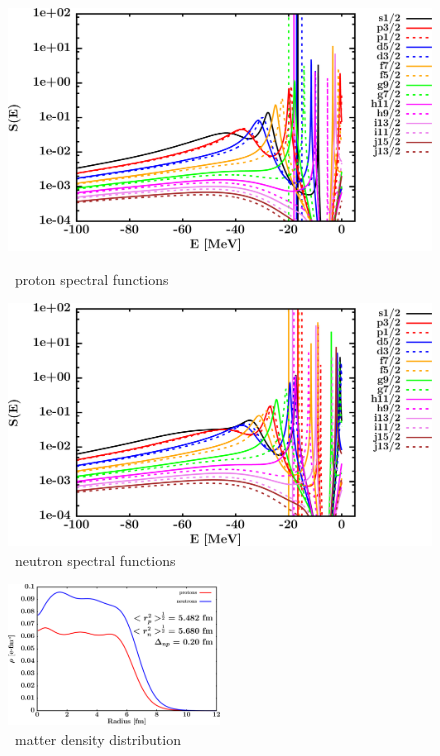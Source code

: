 \begin{figure}[H]
    \centering
    \begin{minipage}{0.45\textwidth}
        \centering
        \includegraphics[width=1.0\textwidth]{figures/pb208_protonSpectralFunctions.png}
        \caption{\pbEight\ proton spectral functions}
        \label{DOMFitData_pb208_proton_spectralFunctions}
    \end{minipage}\hfill
    \begin{minipage}{0.45\textwidth}
        \centering
        \includegraphics[width=1.0\textwidth]{figures/pb208_neutronSpectralFunctions.png}
        \caption{\pbEight\ neutron spectral functions}
        \label{DOMFitData_pb208_neutron_spectralFunctions}
    \end{minipage}
\end{figure}

\begin{figure}[H]
    \centering
    \includegraphics[width = 0.5\textwidth]{figures/pb208_matterDensity.png}
    \caption{\pbEight\ matter density distribution}
    \label{DOMFitData_pb208_matterDensity}
\end{figure}

